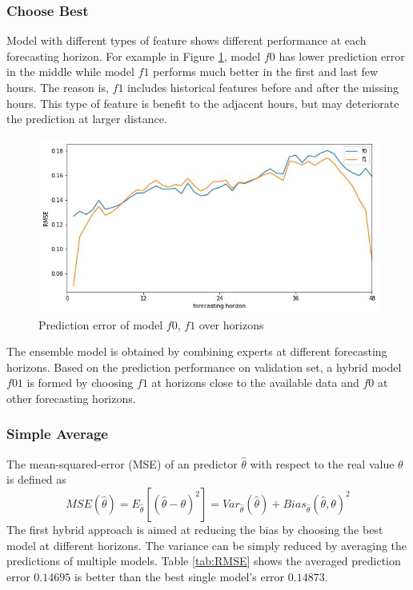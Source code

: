 \documentclass[conference]{IEEEtran}
\begin{document}
\subsubsection{Choose Best}
Model with different types of feature shows different performance at each forecasting horizon. For example in Figure \ref{fig:f0f1}, model $f0$ has lower prediction error in the middle while model $f1$ performs much better in the first and last few hours. The reason is, $f1$ includes historical features before and after the missing hours. This type of feature is benefit to the adjacent hours, but may deteriorate the prediction at larger distance. 
\begin{figure}
\vspace*{-3mm}
\centering
\includegraphics[width=0.8\columnwidth]{FIG/f0f1}
\caption{Prediction error of model $f0$, $f1$ over horizons}
\label{fig:f0f1}
\end{figure}
The ensemble model is obtained by combining experts at different forecasting horizons. Based on the prediction performance on validation set, a hybrid model $f01$ is formed by choosing $f1$ at horizons close to the available data and $f0$ at other forecasting horizons. 

\subsubsection{Simple Average}
The mean-squared-error (MSE) of an predictor $\hat{\theta}$ with respect to the real value $\theta$ is defined as
\begin{equation}
    MSE(\hat{\theta}) = E_{\hat{\theta}}[(\hat{\theta} - \theta)^2] = Var_{\hat{\theta}}(\hat{\theta}) + Bias_{\hat{\theta}}(\hat{\theta}, \theta)^2
\end{equation}
The first hybrid approach is aimed at reducing the bias by choosing the best model at different horizons. The variance can be simply reduced by averaging the predictions of multiple models. Table \ref{tab:RMSE} shows the averaged prediction error $0.14695$ is better than the best single model's error $0.14873$. 
\end{document}

